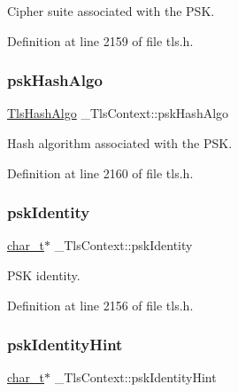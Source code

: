 Cipher suite associated with the P\+SK. 



Definition at line 2159 of file tls.\+h.

\mbox{\label{struct__TlsContext_a2a3c7d46bdf2b5f40fc0267263cbe95a}} 
\subsubsection{\texorpdfstring{psk\+Hash\+Algo}{pskHashAlgo}}
{\footnotesize\ttfamily \hyperlink{tls_8h_a98b0299cd7e197edc67123642089156d}{Tls\+Hash\+Algo} \+\_\+\+Tls\+Context\+::psk\+Hash\+Algo}



Hash algorithm associated with the P\+SK. 



Definition at line 2160 of file tls.\+h.

\mbox{\label{struct__TlsContext_acdbfdaed1815034460049b314d6c7c71}} 
\subsubsection{\texorpdfstring{psk\+Identity}{pskIdentity}}
{\footnotesize\ttfamily \hyperlink{compiler__port_8h_a40bb5262bf908c328fbcfbe5d29d0201}{char\+\_\+t}$\ast$ \+\_\+\+Tls\+Context\+::psk\+Identity}



P\+SK identity. 



Definition at line 2156 of file tls.\+h.

\mbox{\label{struct__TlsContext_ab17b03e7b8f8a69d5ef1f8b225460fdb}} 
\subsubsection{\texorpdfstring{psk\+Identity\+Hint}{pskIdentityHint}}
{\footnotesize\ttfamily \hyperlink{compiler__port_8h_a40bb5262bf908c328fbcfbe5d29d0201}{char\+\_\+t}$\ast$ \+\_\+\+Tls\+Context\+::psk\+Identity\+Hint}



